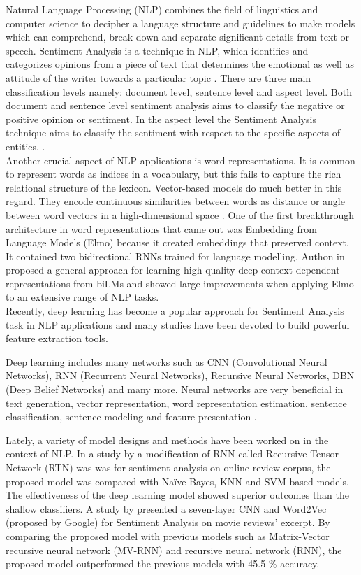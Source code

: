 \documentclass[conference]{IEEEtran}
\begin{document}
Natural Language Processing (NLP) combines the field of linguistics and computer science to decipher a language structure and guidelines to make models which can comprehend, break down and separate significant details from text or speech. Sentiment Analysis is a technique in NLP, which identifies and categorizes opinions from a piece of text that determines the emotional as well as attitude of the writer towards a particular topic \cite{feldman2013techniques}. There are three main classification levels namely: document level, sentence level and aspect level. Both document and sentence level sentiment analysis aims to classify the negative or positive opinion or sentiment. In the aspect level the Sentiment Analysis technique aims to classify the sentiment with respect to the specific aspects of entities. \cite{medhat2014sentiment}. \\
Another crucial aspect of NLP applications is word representations. It is common to represent words as indices in a vocabulary, but this fails to capture the rich relational structure of the lexicon. Vector-based models do much better in this regard. They encode continuous similarities between words as distance or angle between word vectors in a high-dimensional space \cite{ maas2011learning}. One of the first breakthrough architecture in word representations that came out was Embedding from Language Models (Elmo) because it created embeddings that preserved context. It contained two bidirectional RNNs trained for language modelling. Authon in ~\cite{peters2018deep} proposed a general approach for learning high-quality deep context-dependent representations from biLMs and showed large improvements when applying Elmo to an extensive range of NLP tasks.\\
Recently, deep learning has become a popular approach for Sentiment Analysis task in NLP applications and many studies have been devoted to build powerful feature extraction tools.

Deep learning includes many networks such as CNN (Convolutional Neural Networks), RNN (Recurrent Neural Networks), Recursive Neural Networks, DBN (Deep Belief Networks) and many more. Neural networks are very beneficial in text generation, vector representation, word representation estimation, sentence classification, sentence modeling and feature presentation \cite{ zhang2016sentiment}.  

Lately, a variety of model designs and methods have been worked on in the context of NLP. 
In a study by \cite{ li2014identifying} a modification of RNN called Recursive Tensor Network (RTN) was was for sentiment analysis on online review corpus, the proposed model was compared with Naïve Bayes, KNN and SVM based models. The effectiveness of the deep learning model showed superior outcomes than the shallow classifiers. 
A study by \cite{ ouyang2015sentiment} presented a seven-layer CNN and Word2Vec (proposed by Google) for Sentiment Analysis on movie reviews’ excerpt. By comparing the proposed model with previous models such as Matrix-Vector recursive neural network (MV-RNN) and recursive neural network (RNN), the proposed model outperformed the previous models with 45.5 \% accuracy. 
\end{document}
